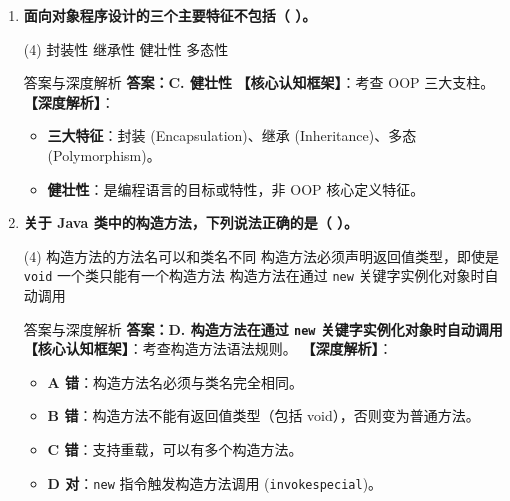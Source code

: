 ﻿\documentclass[12pt, a4paper]{ctexart}
\newcommand{\code}[1]{\texttt{#1}}
\begin{document}
\begin{enumerate}[label=\textbf{\arabic*.}, leftmargin=*, itemsep=1.5em]
	\item \textbf{面向对象程序设计的三个主要特征不包括（ \quad ）。}
	      \begin{tasks}(4)
		      \task 封装性 \task 继承性 \task 健壮性 \task 多态性
	      \end{tasks}
	      \begin{bluebox}{答案与深度解析}
		      \textbf{答案：C. 健壮性}
		      \textbf{【核心认知框架】}：考查 OOP 三大支柱。
		      \textbf{【深度解析】}：
		      \begin{itemize}[leftmargin=*, nosep]
			      \item \textbf{三大特征}：封装 (Encapsulation)、继承 (Inheritance)、多态 (Polymorphism)。
			      \item \textbf{健壮性}：是编程语言的目标或特性，非 OOP 核心定义特征。
		      \end{itemize}
	      \end{bluebox}

	\item \textbf{关于 Java 类中的构造方法，下列说法正确的是（ \quad ）。}
	      \begin{tasks}(4)
		      \task 构造方法的方法名可以和类名不同
		      \task 构造方法必须声明返回值类型，即使是 \code{void}
		      \task 一个类只能有一个构造方法
		      \task 构造方法在通过 \code{new} 关键字实例化对象时自动调用
	      \end{tasks}
	      \begin{bluebox}{答案与深度解析}
		      \textbf{答案：D. 构造方法在通过 \code{new} 关键字实例化对象时自动调用}
		      \textbf{【核心认知框架】}：考查构造方法语法规则。
		      \textbf{【深度解析】}：
		      \begin{itemize}[leftmargin=*, nosep]
			      \item \textbf{A 错}：构造方法名必须与类名完全相同。
			      \item \textbf{B 错}：构造方法不能有返回值类型（包括 void），否则变为普通方法。
			      \item \textbf{C 错}：支持重载，可以有多个构造方法。
			      \item \textbf{D 对}：\code{new} 指令触发构造方法调用 (\code{invokespecial})。
		      \end{itemize}
	      \end{bluebox}


\end{enumerate}
\end{document}
